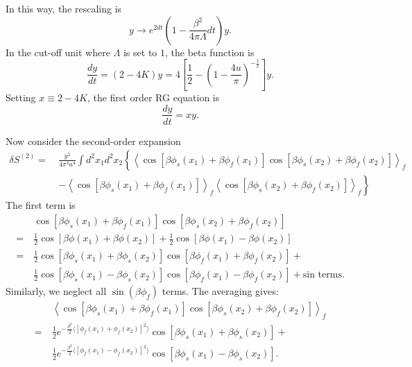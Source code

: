 \documentclass[aps,prb,superscriptaddress,nofootinbib]{revtex4}
\begin{document}
In this way, the rescaling is
\begin{equation}
	y \rightarrow e^{2dt}\left(1-\frac{\beta^2}{4\pi\Lambda}dt\right) y.
\end{equation}
In the cut-off unit where $\Lambda$ is set to $1$, the beta function is
\begin{equation}
	\frac{dy}{dt} = (2-4K) y = 4\left[\frac{1}{2}-\left(1-\frac{4u}{\pi}\right)^{-\frac{1}{2}}\right]y.
\end{equation}
Setting $x\equiv 2-4K$, the first order RG equation is
\begin{equation}
	\frac{dy}{dt} = xy.
\end{equation}

Now consider the second-order expansion
\begin{equation}
\begin{aligned}
	\delta S^{(2)} 
	=&\ \frac{y^2}{4\pi^4 a^4} \int d^2 x_1 d^2 x_2 \left\{ \left\langle \cos\left[\beta\phi_s(x_1)+\beta\phi_f(x_1)\right] \cos\left[\beta\phi_s(x_2)+\beta\phi_f(x_2)\right] \right\rangle_f \right. \\
	&\ \left. -\left\langle \cos\left[\beta\phi_s(x_1)+\beta\phi_f(x_1)\right]\right\rangle_f \left\langle \cos\left[\beta\phi_s(x_2)+\beta\phi_f(x_2)\right]\right\rangle_f \right\}
\end{aligned}
\end{equation}
The first term is 
\begin{equation}
\begin{aligned}
	&\  \cos\left[\beta\phi_s(x_1)+\beta\phi_f(x_1)\right] 
		\cos\left[\beta\phi_s(x_2)+\beta\phi_f(x_2)\right] \\
	=&\ \frac{1}{2}\cos\left[\beta\phi(x_1)+\beta\phi(x_2)\right] + 
	  \frac{1}{2}\cos\left[\beta\phi(x_1)-\beta\phi(x_2)\right] \\
	=&\ \frac{1}{2}\cos\left[\beta\phi_s(x_1)+\beta\phi_s(x_2)\right] \cos\left[\beta\phi_f(x_1)+\beta\phi_f(x_2)\right] + \\
	&\ \frac{1}{2}\cos\left[\beta\phi_s(x_1)-\beta\phi_s(x_2)\right] \cos\left[\beta\phi_f(x_1)-\beta\phi_f(x_2)\right] + \text{sin terms}.
\end{aligned}
\end{equation}
Similarly, we neglect all $\sin(\beta\phi_f)$ terms.
The averaging gives:
\begin{equation}
\begin{aligned}
	&\  \left\langle\cos\left[\beta\phi_s(x_1)+\beta\phi_f(x_1)\right] 
		\cos\left[\beta\phi_s(x_2)+\beta\phi_f(x_2)\right]\right\rangle_f \\
	=&\ \frac{1}{2} e^{-\frac{\beta^2}{2}\langle[\phi_f(x_1)+\phi_f(x_2)]^2\rangle} \cos[\beta\phi_s(x_1)+\beta\phi_s(x_2)] + \\
	&\  \frac{1}{2} e^{-\frac{\beta^2}{2}\langle[\phi_f(x_1)-\phi_f(x_2)]^2\rangle} \cos[\beta\phi_s(x_1)-\beta\phi_s(x_2)].
\end{aligned}
\end{equation}
\end{document}
